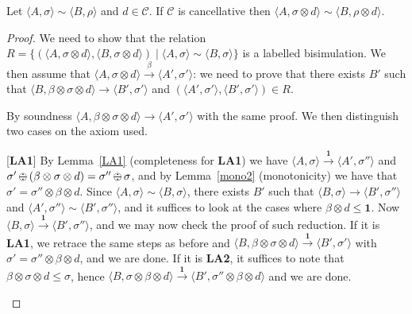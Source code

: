 \documentclass{llncs}
\def\monid{{\mathbf 0}}
\def\odiv{\, {\ominus\hspace{-7.7pt} \div} \,}
\def\monid{\mathbf{1}}
\begin{document}
\begin{theorem}
Let $\langle A,\sigma \rangle \sim \langle B,\rho \rangle$ and $d \in \mathcal{C}$.
If  $\mathcal{C}$ is cancellative then $\langle A,\sigma \otimes d\rangle \sim \langle B,\rho \otimes d \rangle$.
\end{theorem}
\begin{proof}
	We need to show that the relation 
	$R = \{ (\langle A,\sigma \otimes d \rangle, \langle B,\sigma \otimes d \rangle) \mid \langle A,\sigma \rangle \sim \langle B,\sigma \rangle\}$
	is a labelled bisimulation. We then assume that 
	$\langle A, \sigma \otimes d \rangle  \xrightarrow{\beta} \langle A', \sigma' \rangle$: 
	we need to prove that there exists $B'$ such that
	$\langle B,\beta \otimes  \sigma \otimes d \rangle  \xrightarrow{} \langle B', \sigma' \rangle$ 
	and $(\langle A', \sigma' \rangle, \langle B', \sigma' \rangle) \in R$.
	
	By soundness 
	$\langle A, \beta \otimes  \sigma \otimes d \rangle  \xrightarrow{}\langle A', \sigma' \rangle$
	with the same proof.
	We then distinguish two cases on the 
	axiom used.
	
	\begin{description}
		\item{[{\bf LA1}]}
		By Lemma~\ref{LA1} (completeness for {\bf LA1}) we have $\langle A,  \sigma \rangle  \xrightarrow{\monid}\langle A', \sigma'' \rangle$
		and $\sigma' \odiv (\beta \otimes \sigma \otimes d) = \sigma'' \odiv \sigma$, and by Lemma~\ref{mono2} (monotonicity)
		we have that $\sigma' = \sigma'' \otimes \beta \otimes d$.
		Since $\langle A,\sigma \rangle \sim \langle B,\sigma \rangle$, 
		there exists $B'$ such that 
		$\langle B, \sigma \rangle \xrightarrow{} \langle B', \sigma'' \rangle$
		and $\langle A', \sigma'' \rangle \sim \langle B', \sigma'' \rangle$,
		and it suffices to look at the cases where $\beta \otimes d \leq \monid$.
		Now $\langle B, \sigma \rangle \xrightarrow{\monid} \langle B', \sigma'' \rangle$, and we may now check the proof of
		such reduction.
		If it is  {\bf LA1}, we retrace the same steps as before and 
		$\langle B, \beta \otimes  \sigma \otimes d \rangle  \xrightarrow{\monid} \langle B', \sigma' \rangle$
		with $\sigma' = \sigma'' \otimes \beta \otimes d$, and we are done.
		If it is  {\bf LA2}, it suffices to note that $\beta \otimes \sigma \otimes d\leq \sigma$,
		hence $\langle B, \sigma \otimes \beta \otimes d \rangle \xrightarrow{\monid} \langle B', \sigma'' \otimes \beta \otimes d\rangle$
		and we are done.
		

\end{description}
\end{proof}
\end{document}
